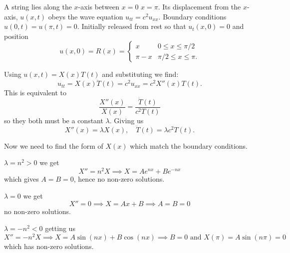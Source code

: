 \documentclass[10pt, a4paper]{article}
\begin{document}
\begin{example}
    A string lies along the $x$-axis between $x = 0$ $x = \pi$.
    Its displacement from the $x$-axis,
    $u(x, t)$ obeys the wave equation $u_{tt} = c ^ 2u_{xx}$.
    Boundary conditions $u(0, t) = u(\pi, t) = 0$.
    Initially released from rest so that $u_t(x, 0) = 0$ and position
    \[
    u(x, 0) = R(x) = \begin{cases}
        x & 0 \leq x \leq \pi / 2 \\
        \pi - x & \pi / 2 \leq x \leq \pi.
    \end{cases}
    \]

    \begin{solution}
        Using $u(x, t) = X(x)T(t)$ and substituting we find:
        \[
        u_{tt} = X(x)\ddot{T}(t) = c ^ 2u_{xx} = c ^ 2X''(x)T(t).
        \]
        This is equivalent to
        \[
        \frac{X''(x)}{X(x)} = \frac{\ddot{T}(t)}{c ^ 2T(t)}
        \]
        so they both must be a constant $\lambda$.
        Giving us
        \[
        X''(x) = \lambda X(x),\quad \ddot{T}(t) = \lambda c ^ 2T(t).
        \]

        Now we need to find the form of $X(x)$ which match the boundary conditions.

        $\lambda = n ^ 2 > 0$ we get
        \[
        X'' = n ^ 2X \implies X = Ae ^ {nx} + Be ^ {-nx}
        \]
        which gives $A = B = 0$,
        hence no non-zero solutions.

        $\lambda = 0$ we get
        \[
        X'' = 0 \implies X = Ax + B \implies A = B = 0
        \]
        no non-zero solutions.

        $\lambda = -n ^ 2 < 0$ getting us
        \[
        X'' = -n ^ 2X \implies X = A\sin(nx) + B\cos(nx) \implies B = 0\text{ and } X(\pi) = A\sin(n\pi) = 0
        \]
        which has non-zero solutions.


\end{solution}
\end{example}
\end{document}
